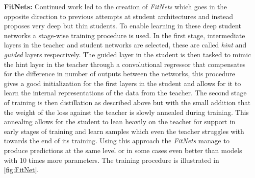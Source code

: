 \documentclass{kththesis}
\newcommand{\bibentry}[1]{\parencite{#1}}
\newcommand{\subsubsubsection}[1]{\vspace{5px}\noindent\textbf{#1:}}
\begin{document}
\subsubsubsection{FitNets}
Continued work led to the creation of \emph{FitNets}
\bibentry{romero2014fitnets} which goes in the opposite direction to previous
attempts at student architectures and instead proposes very deep but thin
students. To enable learning in these deep student networks a stage-wise
training procedure is used. In the first stage, intermediate layers in the
teacher and student networks are selected, these are called \emph{hint} and
\emph{guided} layers respectively. The guided layer in the student is then
tasked to mimic the hint layer in the teacher through a convolutional regressor
that compensates for the difference in number of outputs between the networks,
this procedure gives a good initialization for the first layers in the student
and allows for it to learn the internal representations of the data from the
teacher. The second stage of training is then distillation as described above
but with the small addition that the weight of the loss against the teacher is
slowly annealed during training. This annealing allows for the student to lean
heavily on the teacher for support in early stages of training and learn samples
which even the teacher struggles with towards the end of its training. Using
this approach the \emph{FitNets} manage to produce predictions at the same level
or in some cases even better than models with 10 times more parameters. The
training procedure is illustrated in \cref{fig:FitNet}.
\end{document}
